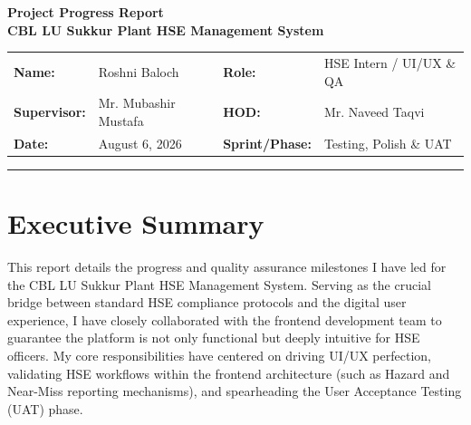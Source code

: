 \documentclass[12pt, a4paper]{article}
\begin{document}
\begin{center}
    {\Huge\bfseries\color{primary} Project Progress Report}\\[0.5cm]
    {\Large\bfseries CBL LU Sukkur Plant HSE Management System}\\[1cm]
\end{center}

\noindent\begin{tabularx}{\textwidth}{@{}lXlX@{}}
    \textbf{Name:} & Roshni Baloch & \textbf{Role:} & HSE Intern / UI/UX \& QA \\
    \textbf{Supervisor:} & Mr. Mubashir Mustafa & \textbf{HOD:} & Mr. Naveed Taqvi \\
    \textbf{Date:} & August 6, 2026 & \textbf{Sprint/Phase:} & Testing, Polish \& UAT \\
\end{tabularx}
\vspace{0.5cm}
\hrule
\vspace{1cm}

\section{Executive Summary}
This report details the progress and quality assurance milestones I have led for the CBL LU Sukkur Plant HSE Management System. Serving as the crucial bridge between standard HSE compliance protocols and the digital user experience, I have closely collaborated with the frontend development team to guarantee the platform is not only functional but deeply intuitive for HSE officers. My core responsibilities have centered on driving UI/UX perfection, validating HSE workflows within the frontend architecture (such as Hazard and Near-Miss reporting mechanisms), and spearheading the User Acceptance Testing (UAT) phase.
\end{document}
